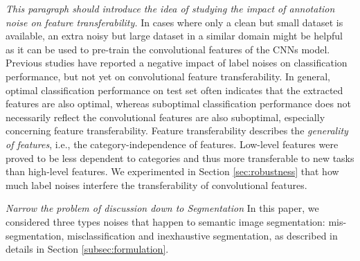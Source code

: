 \noindent \textit{This paragraph should introduce the idea of studying the impact of annotation noise on feature transferability.}
\noindent
In cases where only a clean but small dataset is available, an extra noisy but large dataset in a similar domain might be helpful as it can be used to pre-train the convolutional features of the CNNs model.
Previous studies\cite{sukhbaatar2014training,patrini2016making} have reported a negative impact of label noises on classification performance, but not yet on convolutional feature transferability.
In general, optimal classification performance on test set often indicates that the extracted features are also optimal, whereas suboptimal classification performance does not necessarily reflect the convolutional features are also suboptimal, especially concerning feature transferability.
Feature transferability describes the \textit{generality of features}, i.e., the category-independence of features.
Low-level features were proved to be less dependent to categories and thus more transferable to new tasks than high-level features. \cite{yosinski2014transferable}
We experimented in Section \ref{sec:robustness} that how much label noises interfere the transferability of convolutional features.

\noindent \textit{Narrow the problem of discussion down to Segmentation}
\noindent
In this paper, we considered three types noises that happen to semantic image segmentation: mis-segmentation, misclassification and inexhaustive segmentation, as described in details in Section \ref{subsec:formulation}.





